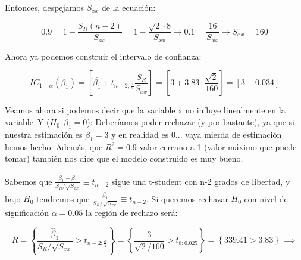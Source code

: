 \begin{problem}[2]
Entonces, despejamos $S_{xx}$ de la ecuación:

\[
0.9 = 1 - \frac{S_R(n-2)}{S_{xx}} = 1 - \frac{\sqrt{2}·8}{S_{xx}} \to 0.1 = \frac{16}{S_{xx}} \to S_{xx} = 160
\]

Ahora ya podemos construir el intervalo de confianza:

\[ IC_{1-α}(β_1) = \left[ \hat{β_1} \mp t_{n-2;\frac{α}{2}} \frac{S_R}{S_{xx}} \right] = \left[ 3\mp 3.83·\frac{\sqrt{2}}{160} \right] = \left[ 3\mp 0.034\right]\]


Veamos ahora si podemos decir que la variable x no influye linealmente en la variable~Y ($H_0: β_1=0$): Deberíamos poder rechazar (y por bastante), ya que si nuestra estimación es $\hat{β_1} = 3$ y en realidad es 0... vaya mierda de estimación hemos hecho. Además, que $R^2 = 0.9$ valor cercano a 1 (valor máximo que puede tomar) también nos dice que el modelo construido es muy bueno.

Sabemos que $\frac{\hat{β}_1 - β_1}{S_R / \sqrt{S_{xx}}} \equiv t_{n-2}$ sigue una t-student con n-2 grados de libertad, y bajo $H_0$ tendremos que $\frac{\hat{β}_1 }{S_R / \sqrt{S_{xx}}} \equiv t_{n-2}$. Si queremos rechazar $H_0$ con nivel de significación $α=0.05$ la región de rechazo será:

\[R = \left\{ \frac{\hat{β}_1 }{S_R / \sqrt{S_{xx}}} > t_{n-2;\frac{α}{2}} \right\} = \left\{ \frac{3}{\sqrt{2} / 160} > t_{8;0.025} \right\} = \left\{ 339.41 > 3.83 \right\}\implies \]
\end{problem}



